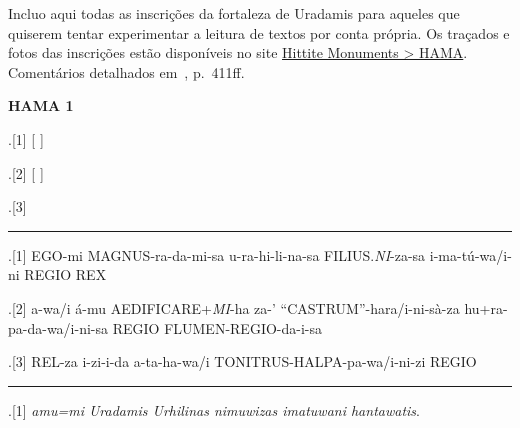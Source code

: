 
Incluo aqui todas as inscrições da fortaleza de Uradamis para aqueles que
quiserem tentar experimentar a leitura de textos por conta própria.
Os traçados e fotos das inscrições estão disponíveis no site
\href{https://www.hittitemonuments.com/hama/}{Hittite Monuments > HAMA}.
Comentários detalhados em~, p.\ 411ff.


\begin{flushleft}

\noindent \textbf{HAMA 1}

\ex.[1] \large {}\hspace{5pt}
\hspace{5pt}
\hspace{5pt}
\hspace{5pt}
[\hspace{5pt}
 ]

\ex.[2] \large [\hspace{5pt}
\hspace{5pt}
\hspace{5pt}
]\hspace{5pt}
\hspace{5pt}
\hspace{5pt}

\ex.[3] \large {} \hspace{5pt}
\hspace{5pt}
\hspace{5pt}


\hrule

	\ex.[1]  {EGO-mi}
{MAGNUS-ra-da-mi-sa}
{u-ra-hi-li-na-sa}
{FILIUS.\emph{NI}-za-sa}
{i-ma-tú-wa/i-ni}
{REGIO}
{REX}

\ex.[2]  {a-wa/i} {á-mu} {AEDIFICARE+\emph{MI}-ha} {za-'} {``CASTRUM''-hara/i-ni-sà-za}
{hu+ra-pa-da-wa/i-ni-sa REGIO}
{FLUMEN-REGIO-da-i-sa}

\ex.[3]  {REL-za i-zi-i-da}
{a-ta-ha-wa/i}
{TONITRUS-HALPA-pa-wa/i-ni-zi REGIO}


\hrule

\ex.[1] \emph{amu=mi Uradamis Urhilinas nimuwizas imatuwani hantawatis}.


\end{flushleft}
